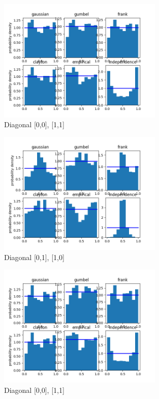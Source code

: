 

\begin{figure}[h]
	\centering
	\includegraphics[width=0.7\textwidth]{test_more_h/2015-01-01_12_00-2015-01-01_13_00-0.png}
	\caption{Diagonal [0,0], [1,1]}
\end{figure}

\begin{figure}[h]
	\centering
	\includegraphics[width=0.7\textwidth]{test_more_h/2015-01-01_12_00-2015-01-01_13_00-1.png}
	\caption{Diagonal [0,1], [1,0]}
\end{figure}

\clearpage



\begin{figure}[h]
	\centering
	\includegraphics[width=0.7\textwidth]{test_more_h/2015-01-02_12_00-2015-01-02_13_00-0.png}
	\caption{Diagonal [0,0], [1,1]}
\end{figure}

